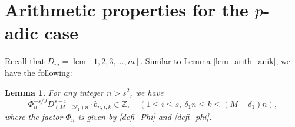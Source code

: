 \documentclass[12pt]{article}
\newtheorem{lemma}[theorem]{Lemma}
\numberwithin{equation}{section}
\begin{document}
\bigskip

\section{Arithmetic properties for the $p$-adic case}\label{Sect_arit_p}

Recall that $D_{m} = \operatorname{lcm}[1,2,3,\ldots,m]$. Similar to Lemma \ref{lem_arith_anik}, we have the following:

\begin{lemma}\label{lem_arith_bnik}
For any integer $n > s^2$, we have
\[ \Phi_n^{-s/J} D_{(M-2\delta_1)n}^{s-i} \cdot  b_{n,i,k} \in \mathbb{Z}, \quad (1 \leqslant i \leqslant s,~\delta_1n \leqslant k \leqslant (M-\delta_1)n),   \]
where the factor $\Phi_n$ is given by \eqref{defi_Phi} and \eqref{defi_phi}.
\end{lemma}
\end{document}
